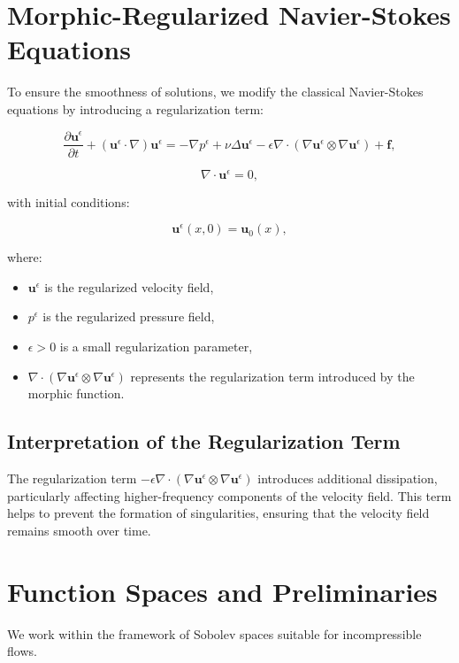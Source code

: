 \documentclass[12pt]{article}
\begin{document}
\section{Morphic-Regularized Navier-Stokes Equations}
To ensure the smoothness of solutions, we modify the classical Navier-Stokes equations by introducing a regularization term:

\begin{equation}
\frac{\partial \mathbf{u}^\epsilon}{\partial t} + (\mathbf{u}^\epsilon \cdot \nabla)\mathbf{u}^\epsilon = -\nabla p^\epsilon + \nu \Delta \mathbf{u}^\epsilon - \epsilon \nabla \cdot (\nabla \mathbf{u}^\epsilon \otimes \nabla \mathbf{u}^\epsilon) + \mathbf{f},
\end{equation}

\begin{equation}
\nabla \cdot \mathbf{u}^\epsilon = 0,
\end{equation}

with initial conditions:

\begin{equation}
\mathbf{u}^\epsilon(x, 0) = \mathbf{u}_0(x),
\end{equation}

where:

\begin{itemize}
    \item \(\mathbf{u}^\epsilon\) is the regularized velocity field,
    \item \(p^\epsilon\) is the regularized pressure field,
    \item \(\epsilon > 0\) is a small regularization parameter,
    \item \(\nabla \cdot (\nabla \mathbf{u}^\epsilon \otimes \nabla \mathbf{u}^\epsilon)\) represents the regularization term introduced by the morphic function.
\end{itemize}

\subsection{Interpretation of the Regularization Term}
The regularization term \(-\epsilon \nabla \cdot (\nabla \mathbf{u}^\epsilon \otimes \nabla \mathbf{u}^\epsilon)\) introduces additional dissipation, particularly affecting higher-frequency components of the velocity field. This term helps to prevent the formation of singularities, ensuring that the velocity field remains smooth over time.

\section{Function Spaces and Preliminaries}
We work within the framework of Sobolev spaces suitable for incompressible flows.
\end{document}
